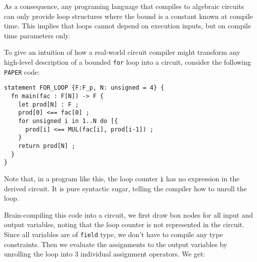 As a consequence, any programing language that compiles to algebraic circuits can only provide loop structures where the bound is a constant known at compile time. This implies that loops cannot depend on execution inputs, but on compile time parameters only.  
\begin{example} To give an intuition of how a real-world circuit compiler might transform any high-level description of a bounded \texttt{for} loop into a circuit, consider the following \texttt{PAPER} code:
\begin{lstlisting}
statement FOR_LOOP {F:F_p, N: unsigned = 4} {
  fn main(fac : F[N]) -> F {
  	let prod[N] : F ;
  	prod[0] <== fac[0] ;
    for unsigned i in 1..N do [{
      prod[i] <== MUL(fac[i], prod[i-1]) ; 
    }
    return prod[N] ;
  }
}
\end{lstlisting}
Note that, in a program like this, the loop counter \texttt{i} has no expression in the derived circuit. It is pure syntactic sugar, telling the compiler how to unroll the loop.

Brain-compiling this code into a circuit, we first draw box nodes for all input and output variables, noting that the loop counter is not represented in the circuit. Since all variables are of \texttt{field} type, we don't have to compile any type constraints. Then we evaluate the assignments to the output variables by unrolling the loop into $3$ individual assignment operators. We get:
\begin{center}
\end{center}
\end{example}
